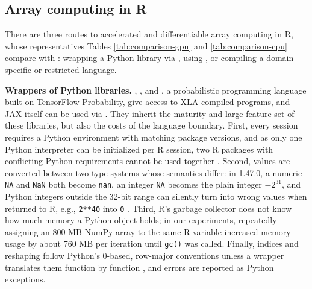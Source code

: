 \subsection{Array computing in R}\label{in-r}

There are three routes to accelerated and differentiable array computing in R, whose representatives Tables \ref{tab:comparison-gpu} and \ref{tab:comparison-cpu} compare with : wrapping a Python library via  \citep{ref-reticulate}, using , or compiling a domain-specific or restricted language.

\textbf{Wrappers of Python libraries.}
 \citep{ref-r-tensorflow},  \citep{ref-keras3}, and  \citep{ref-greta}, a probabilistic programming language built on TensorFlow Probability, give access to XLA-compiled programs, and JAX itself can be used via .
They inherit the maturity and large feature set of these libraries, but also the costs of the language boundary.
First, every session requires a Python environment with matching package versions, and as only one Python interpreter can be initialized per R session, two R packages with conflicting Python requirements cannot be used together \citep{ref-reticulate-pyrequire}.
Second, values are converted between two type systems whose semantics differ: in  1.47.0, a numeric \texttt{NA} and \texttt{NaN} both become \texttt{nan}, an integer \texttt{NA} becomes the plain integer \(-2^{31}\), and Python integers outside the 32-bit range can silently turn into wrong values when returned to R, e.g., \texttt{2**40} into \texttt{0} \citep{ref-reticulate-issue197, ref-reticulate-issue1647}.
Third, R's garbage collector does not know how much memory a Python object holds; in our experiments, repeatedly assigning an 800 MB NumPy array to the same R variable increased memory usage by about 760 MB per iteration until \texttt{gc()} was called.
Finally, indices and reshaping follow Python's 0-based, row-major conventions unless a wrapper translates them function by function \citep{ref-reticulate-arrays, ref-tf-slicing}, and errors are reported as Python exceptions.

